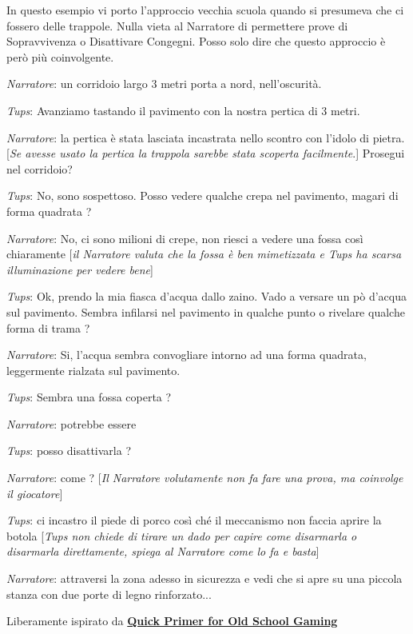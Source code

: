 \begin{narratore}
In questo esempio vi porto l'approccio vecchia scuola quando si presumeva che ci fossero delle trappole. Nulla vieta al Narratore di permettere prove di Sopravvivenza o Disattivare Congegni. Posso solo dire che questo approccio è però più coinvolgente.

\bigskip

\emph{Narratore}: un corridoio largo 3 metri porta a nord, nell'oscurità.

\emph{Tups}: Avanziamo tastando il pavimento con la nostra pertica di 3 metri.

\emph{Narratore}: la pertica è stata lasciata incastrata nello scontro con l'idolo di pietra.
[\emph{Se avesse usato la pertica la trappola sarebbe stata scoperta facilmente}.]
Prosegui nel corridoio?

\emph{Tups}: No, sono sospettoso. Posso vedere qualche crepa nel pavimento, magari di forma quadrata ?

\emph{Narratore}: No, ci sono milioni di crepe, non riesci a vedere una fossa così chiaramente [\emph{il Narratore valuta che la fossa è ben mimetizzata e Tups ha scarsa illuminazione per vedere bene}]

\emph{Tups}: Ok, prendo la mia fiasca d'acqua dallo zaino. Vado a versare un pò d'acqua sul pavimento. Sembra infilarsi nel pavimento in qualche punto o rivelare qualche forma di trama ?

\emph{Narratore}: Si, l'acqua sembra convogliare intorno ad una forma quadrata, leggermente rialzata sul pavimento.

\emph{Tups}: Sembra una fossa coperta ?

\emph{Narratore}: potrebbe essere

\emph{Tups}: posso disattivarla ?

\emph{Narratore}: come ? [\emph{Il Narratore volutamente non fa fare una prova, ma coinvolge il giocatore}]

\emph{Tups}: ci incastro il piede di porco così ché il meccanismo non faccia aprire la botola [\emph{Tups non chiede di tirare un dado per capire come disarmarla o disarmarla direttamente, spiega al Narratore come lo fa e basta}]

\emph{Narratore}: attraversi la zona adesso in sicurezza e vedi che si apre su una piccola stanza con due porte di legno rinforzato...

\medskip

Liberamente ispirato da \href{https://friendorfoe.com/d/Old%20School%20Primer.pdf}{ \textbf{Quick Primer for Old School Gaming}}

\end{narratore}

